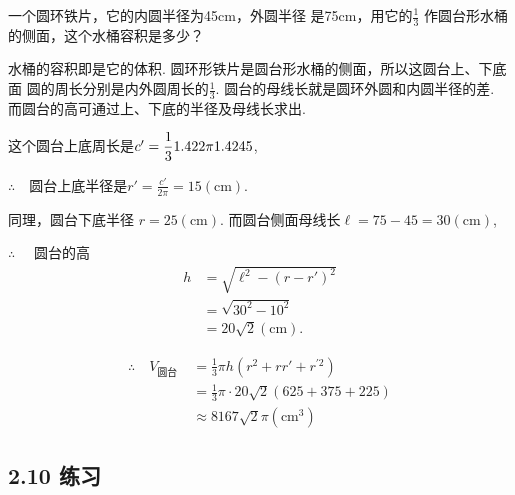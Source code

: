 \noindent
\begin{minipage}{.7\textwidth}\CTEXindent
    \begin{example}
    一个圆环铁片，它的内圆半径为45cm，外圆半径
是75cm，用它的$\frac{1}{3}$ 作圆台形水桶的侧面，这个水桶容积是多少？
\end{example}

\begin{analyze}
 水桶的容积即是它的体积. 圆环形铁片是圆台形水桶的侧面，所以这圆台上、下底面
圆的周长分别是内外圆周长的$\frac{1}{3}$. 圆台的母线长就是圆环外圆和内圆半径的差. 而圆台的高可通过上、下底的半径及母线长求出.   
\end{analyze}
\end{minipage}\hfill 
\begin{minipage}{.25\textwidth}
    \centering
{}
\end{minipage}

\begin{solution}
这个圆台上底周长是$c'=\dfrac{1}{3}1.42  2\pi1.42 45$,

$\therefore\quad $圆台上底半径是$r'=\frac{c'}{2\pi}=15(\mathrm{cm})$.

同理，圆台下底半径 $r=25(\mathrm{cm})$.
而圆台侧面母线长$\ell=75-45=30(\mathrm{cm})$,

$\therefore\quad$ 圆台的高 
\[\begin{split}
h&=\sqrt{\ell^{2}-\left(r-r'\right)^{2}}\\
&=\sqrt{30^{2}-10^{2}}\\
&=20\sqrt{2}(\mathrm{cm}).    
\end{split}\]

\[\begin{split}
\therefore\quad V_{\text{圆台 }}&=\frac{1}{3}\pi h\left(r^{2}+rr'+r^{\prime 2}\right)\\
&=\frac{1}{3}\pi\cdot 20\sqrt{2}(625+375+225)\\
&\approx 8167\sqrt{2}\pi \left(\mathrm{cm}^{3}\right)    
\end{split}\]
\end{solution}


\subsection*{2.10 练习}

